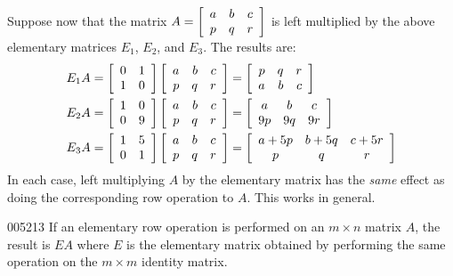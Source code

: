 Suppose now that the matrix $A = \left[ \begin{array}{ccc}
a & b & c \\
p & q & r
\end{array} \right]$
 is left multiplied by the above elementary matrices $E_{1}$, $E_{2}$, and $E_{3}$. The results are:
\begin{align*}
E_{1}A &= \left[ \begin{array}{rr}
0 & 1 \\
1 & 0
\end{array} \right] \left[ \begin{array}{rrr}
a & b & c \\
p & q & r
\end{array} \right] = \left[ \begin{array}{rrr}
p & q & r \\
a & b & c
\end{array} \right] \\
E_{2}A &= \left[ \begin{array}{rr}
1 & 0 \\
0 & 9
\end{array} \right] \left[ \begin{array}{rrr}
a & b & c \\
p & q & r
\end{array} \right] = \left[ \begin{array}{ccc}
a & b & c \\
9p & 9q & 9r
\end{array} \right] \\
E_{3}A &= \left[ \begin{array}{rr}
1 & 5 \\
0 & 1
\end{array} \right] \left[ \begin{array}{ccc}
a & b & c \\
p & q & r
\end{array} \right] = \left[ \begin{array}{ccc}
a + 5p & b + 5q & c + 5r \\
p & q & r
\end{array} \right]
\end{align*}
In each case, left multiplying $A$ by the elementary matrix has the \textit{same} effect as doing the corresponding row operation to $A$. This works in general.

\begin{lemma}{\footnotemark}{005213}
If an elementary row operation is performed on an $m \times n$ matrix $A$, the result is $EA$ where $E$ is the elementary matrix obtained by performing the same operation on the $m \times m$ identity matrix.
\end{lemma} 

